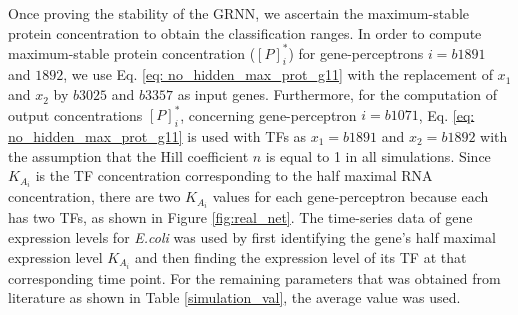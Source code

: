 \documentclass[twocolumn]{biophys-new}
\begin{document}
{{%

Once proving the stability of the GRNN, we ascertain the maximum-stable protein concentration to obtain the classification ranges.  
In order to compute maximum-stable protein concentration ($[P]^*_i$) for gene-perceptrons $i=b1891$ and  $1892 $, we use Eq. \ref{eq: no_hidden_max_prot_g11} with the  replacement of   $x_1$ and $x_2$  by $b3025$ and $b3357$ as input genes. Furthermore, for the computation of output concentrations $[P]^*_i$, concerning gene-perceptron $i=b1071$, Eq. \ref{eq: no_hidden_max_prot_g11} is used with TFs as $x_1=b1891$ and $x_2=b1892$ with the assumption that the Hill coefficient $n$ is equal to 1 in all simulations. Since $K_{A_i}$ is the TF concentration corresponding to the half maximal RNA concentration, there are two $K_{A_i}$ values for each gene-perceptron because each has two TFs, as shown in Figure \ref{fig:real_net}. %
The time-series data of gene expression levels for \emph{E.coli} was used by first identifying the gene's half maximal expression level $K_{A_i}$ and then finding the  expression level of its TF at that corresponding time point. For the remaining parameters that was obtained from literature as shown in Table \ref{simulation_val}, the average value was used.  



}}
\end{document}
